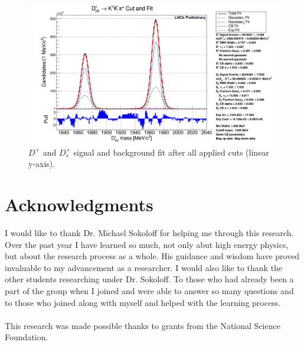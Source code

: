 \documentclass[12pt, letterpaper]{article}
\begin{document}
\begin{figure}[h!]
\centering
\includegraphics[width=0.8\linewidth]{bigfitlinear.png}
\caption{$D^+$ and $D^+_s$ signal and background fit after all applied cuts (linear y-axis).}
\label{fig:fitlinear}
\end{figure}





\section*{Acknowledgments}
I would like to thank Dr. Michael Sokoloff for helping me through this research. Over the past year I have learned so much, not only abut high energy physics, but about the research process as a whole. His guidance and wisdom have proved invaluable to my advancement as a researcher. I would also like to thank the other students researching under Dr. Sokoloff. To those who had already been a part of the group when I joined and were able to answer so many questions and to those who joined along with myself and helped with the learning process. 
\\
\\
This research was made possible thanks to grants from the National Science Foundation.















\newpage
\newpage
\end{document}
